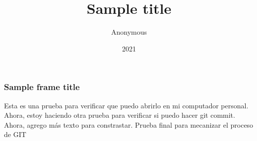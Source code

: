 \documentclass{beamer}
\title{Sample title}
\author{Anonymous}
\institute{Overleaf}
\date{2021}
\begin{document}
\frame{\titlepage}    

\begin{frame}
\frametitle{Sample frame title}
Esta es una prueba para verificar que puedo abrirlo en mi computador personal. Ahora, estoy haciendo otra prueba para verificar si puedo hacer git commit. Ahora, agrego más texto para constrastar. Prueba final para mecanizar el proceso de GIT
\end{frame}
\end{document}
